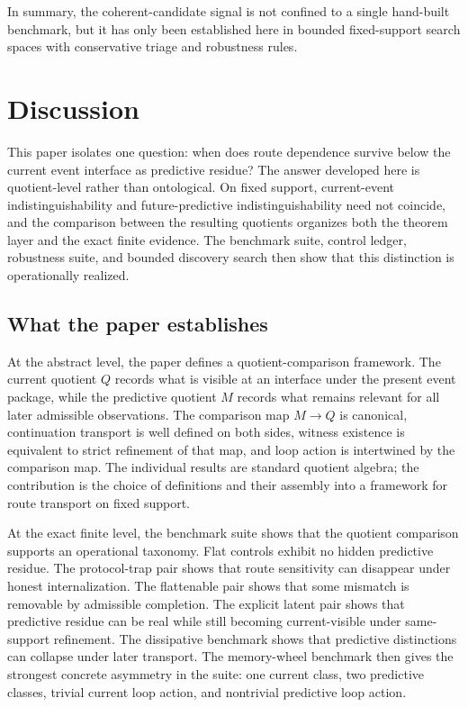 \documentclass[11pt]{article}
\newcommand{\CurrentQ}{Q}
\newcommand{\PredictiveQ}{M}
\theoremstyle{definition}
\begin{document}
In summary, the coherent-candidate signal is not confined to a single hand-built benchmark, but it has only been established here in bounded fixed-support search spaces with conservative triage and robustness rules.

\section{Discussion}\label{sec:discussion}
This paper isolates one question: when does route dependence survive below the current event interface as predictive residue? The answer developed here is quotient-level rather than ontological. On fixed support, current-event indistinguishability and future-predictive indistinguishability need not coincide, and the comparison between the resulting quotients organizes both the theorem layer and the exact finite evidence. The benchmark suite, control ledger, robustness suite, and bounded discovery search then show that this distinction is operationally realized.

\subsection{What the paper establishes}\label{subsec:discussion-established}
At the abstract level, the paper defines a quotient-comparison framework. The current quotient $\CurrentQ$ records what is visible at an interface under the present event package, while the predictive quotient $\PredictiveQ$ records what remains relevant for all later admissible observations. The comparison map $\PredictiveQ \to \CurrentQ$ is canonical, continuation transport is well defined on both sides, witness existence is equivalent to strict refinement of that map, and loop action is intertwined by the comparison map. The individual results are standard quotient algebra; the contribution is the choice of definitions and their assembly into a framework for route transport on fixed support.

At the exact finite level, the benchmark suite shows that the quotient comparison supports an operational taxonomy. Flat controls exhibit no hidden predictive residue. The protocol-trap pair shows that route sensitivity can disappear under honest internalization. The flattenable pair shows that some mismatch is removable by admissible completion. The explicit latent pair shows that predictive residue can be real while still becoming current-visible under same-support refinement. The dissipative benchmark shows that predictive distinctions can collapse under later transport. The memory-wheel benchmark then gives the strongest concrete asymmetry in the suite: one current class, two predictive classes, trivial current loop action, and nontrivial predictive loop action.
\end{document}
